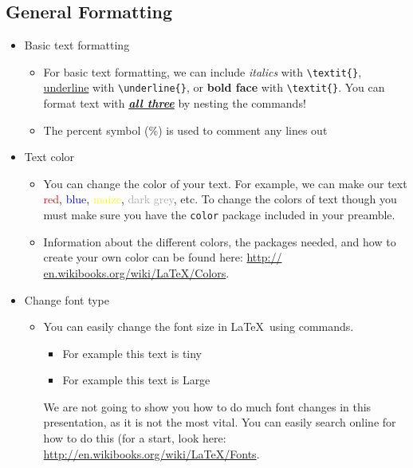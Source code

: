 \documentclass[]{article}%
\newcommand{\bs}{\textbackslash}
\newcommand{\TT}[1]{\texttt{#1}}
\newcommand{\tpc}{\textperiodcentered}
\theoremstyle{definition}
\begin{document}
	\subsection{General Formatting}
	\begin{itemize}
		\item Basic text formatting
		\begin{itemize}
			\item For basic text formatting, we can include \textit{italics} with \TT{\bs textit\{\tpc\}}, \underline{underline} with \TT{\bs underline\{\tpc\}}, or \textbf{bold face} with \TT{\bs textit\{\tpc\}}.
			You can format text with \textit{\underline{\textbf{all three}}} by nesting the commands!
			\item The percent symbol (\%) is used to comment any lines out
		\end{itemize}
		\item Text color
		\begin{itemize}
			\item You can change the color of your text.
			For example, we can make our text \textcolor{red}{red}, \textcolor{blue}{blue}, \textcolor{yellow}{maize}, \textcolor{darkgrey}{dark grey}, etc.
			To change the colors of text though you must make sure you have the \TT{color} package included in your preamble.
			\item Information about the different colors, the packages needed, and how to create your own color can be found here: \url{http://	en.wikibooks.org/wiki/LaTeX/Colors}.
		\end{itemize}
		\item Change font type
		\begin{itemize}
			\item You can easily change the font size in \LaTeX\ using commands.
			\begin{itemize}
				\item \tiny For example this text is tiny
				\item \LARGE For example this text is Large
			\end{itemize}
			We are not going to show you how to do much font changes in this presentation, as it is not the most vital.
			You can easily search online for how to do this (for a start, look here: \url{http://en.wikibooks.org/wiki/LaTeX/Fonts}.

\end{itemize}
\end{itemize}
\end{document}
